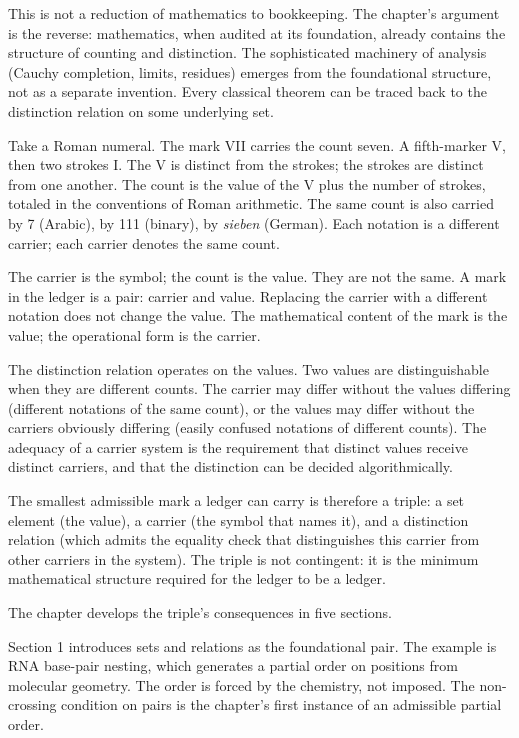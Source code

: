 \begin{chapteressay}
This is not a reduction of mathematics to bookkeeping. The chapter's
argument is the reverse: mathematics, when audited at its foundation,
already contains the structure of counting and distinction. The
sophisticated machinery of analysis (Cauchy completion, limits, residues)
emerges from the foundational structure, not as a separate invention.
Every classical theorem can be traced back to the distinction relation
on some underlying set.

Take a Roman numeral. The mark VII carries the count seven. A
fifth-marker V, then two strokes I. The V is distinct from the
strokes; the strokes are distinct from one another. The count is
the value of the V plus the number of strokes, totaled in the
conventions of Roman arithmetic. The same count is also carried by
7 (Arabic), by 111 (binary), by \emph{sieben} (German). Each
notation is a different carrier; each carrier denotes the same
count.

The carrier is the symbol; the count is the value. They are not the
same. A mark in the ledger is a pair: carrier and value. Replacing the
carrier with a different notation does not change the value. The
mathematical content of the mark is the value; the operational form is
the carrier.

The distinction relation operates on the values. Two values are
distinguishable when they are different counts. The carrier may differ
without the values differing (different notations of the same count),
or the values may differ without the carriers obviously differing
(easily confused notations of different counts). The adequacy of a
carrier system is the requirement that distinct values receive distinct
carriers, and that the distinction can be decided algorithmically.

The smallest admissible mark a ledger can carry is therefore a triple:
a set element (the value), a carrier (the symbol that names it), and a
distinction relation (which admits the equality check that distinguishes
this carrier from other carriers in the system). The triple is not
contingent: it is the minimum mathematical structure required for the
ledger to be a ledger.

The chapter develops the triple's consequences in five sections.

Section 1 introduces sets and relations as the foundational pair. The
example is RNA base-pair nesting, which generates a partial order on
positions from molecular geometry. The order is forced by the
chemistry, not imposed. The non-crossing condition on pairs is the
chapter's first instance of an admissible partial order.


\end{chapteressay}
